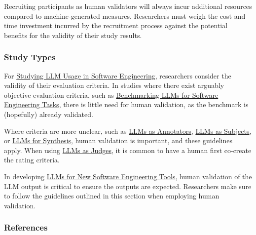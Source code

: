 Recruiting participants as human validators will always incur additional resources compared to machine-generated measures.
Researchers must weigh the cost and time investment incurred by the recruitment process against the potential benefits for the validity of their study results.

\subsubsection{Study Types}

For \href{/study-types/#studying-llm-usage-in-software-engineering}{Studying LLM Usage in Software Engineering}, researchers \should consider the validity of their evaluation criteria.
In studies where there exist arguably objective evaluation criteria, such as \href{/study-types/#benchmarking-llms-for-software-engineering-tasks}{Benchmarking LLMs for Software Engineering Tasks}, there is little need for human validation, as the benchmark is (hopefully) already validated.

Where criteria are more unclear, such as \href{/study-types/#llms-as-annotators}{LLMs as Annotators}, \href{/study-types/#llms-as-subjects}{LLMs as Subjects}, or \href{/study-types/#llms-for-synthesis}{LLMs for Synthesis}, human validation is important, and these guidelines apply. When using \href{/study-types/#llms-as-judges}{LLMs as Judges}, it is common to have a human first co-create the rating criteria. 

In developing \href{/study-types/#llms-for-new-software-engineering-tools}{LLMs for New Software Engineering Tools}, human validation of the LLM output is critical to ensure the outputs are expected.
Researchers \should make sure to follow the guidelines outlined in this section when employing human validation.

\subsubsection{References}





